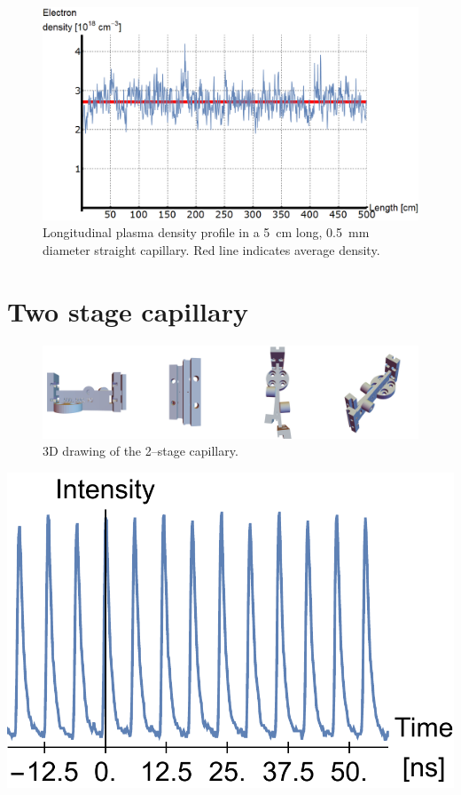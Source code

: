 \documentclass[justified,nofonts,nobib,openany]{tufte-book}
\begin{document}
\begin{figure}
    \centering
    \includegraphics[width=\textwidth]{figures/spectro/longitudinal_profile.png}
    \caption{Longitudinal plasma density profile in a \SI{5}{\cm} long, \SI{0.5}{\mm} diameter straight capillary. Red line indicates average density.}
    \label{fig:longi_profile}
\end{figure}

\section{Two stage capillary}

\begin{figure}[b]
    \centering
    \includegraphics[width=\textwidth]{figures/doublecapillary_cad.png}
    \caption{3D drawing of the 2--stage capillary.}
    \label{fig:doublecapillaryCAD}
\end{figure}

\begin{marginfigure}
\includegraphics[width=\marginparwidth]{figures/oscillator/double.pdf}
\label{fig:oscillator_double}
\caption{Two \SI{84}{\MHz} temporal beam profiles of the oscillator laser, one delayed with respect to the other.}
\end{marginfigure}
\end{document}
